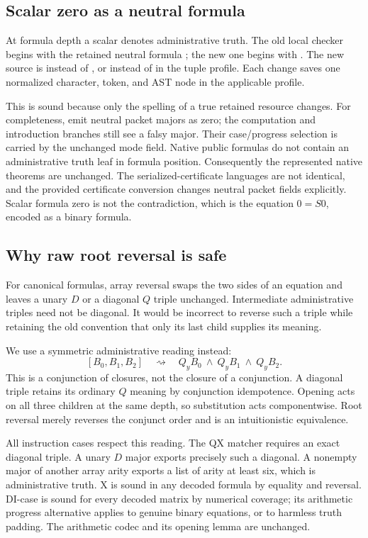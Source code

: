 \subsection{Scalar zero as a neutral formula}

At formula depth a scalar denotes administrative truth. The old local
checker begins with the retained neutral formula \code{[]}; the new
one begins with . The new source is  instead of
, or  instead of  in the tuple
profile. Each change saves one normalized character, token, and AST
node in the applicable profile.

This is sound because only the spelling of a true retained resource
changes. For completeness, emit neutral packet majors as zero; the
computation and introduction branches still see a falsy major. Their
case/progress selection is carried by the unchanged mode field. Native
public formulas do not contain an administrative truth leaf in formula
position. Consequently the represented native theorems are unchanged.
The serialized-certificate languages are not identical, and the
provided certificate conversion changes neutral packet fields explicitly.
Scalar formula zero is not the contradiction, which is the equation
$0=S0$, encoded as a binary formula.

\subsection{Why raw root reversal is safe}
\label{sec:raw-reversal}

For canonical formulas, array reversal swaps the two sides of an
equation and leaves a unary $D$ or a diagonal $Q$ triple unchanged.
Intermediate administrative triples need not be diagonal. It would be
incorrect to reverse such a triple while retaining the old convention
that only its last child supplies its meaning.

We use a symmetric administrative reading instead:
\[
 [B_0,B_1,B_2]\quad\rightsquigarrow\quad
 Q_yB_0\ \land\ Q_yB_1\ \land\ Q_yB_2.
 \tag{Triple reading}\label{eq:triple-reading}
\]
This is a conjunction of closures, not the closure of a conjunction.
A diagonal triple retains its ordinary $Q$ meaning by conjunction
idempotence. Opening acts on all three children at the same depth, so
substitution acts componentwise. Root reversal merely reverses the
conjunct order and is an intuitionistic equivalence.

All instruction cases respect this reading. The QX matcher requires an
exact diagonal triple. A unary $D$ major exports precisely such a
diagonal. A nonempty major of another array arity exports a list of
arity at least six, which is administrative truth. X is sound in any
decoded formula by equality and reversal. DI-case is sound for every
decoded matrix by numerical coverage; its arithmetic progress alternative
applies to genuine binary equations, or to harmless truth padding.
The arithmetic codec and its opening lemma are unchanged.

